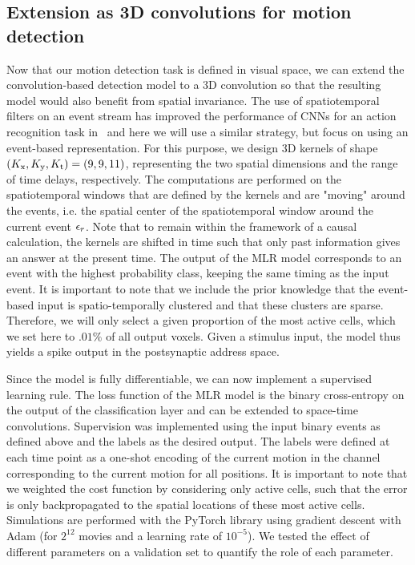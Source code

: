 \documentclass[default]{sn-jnl}%
\theoremstyle{thmstyleone}%
\theoremstyle{thmstyletwo}%
\theoremstyle{thmstylethree}%
\begin{document}
\subsection{Extension as 3D convolutions for motion detection}
%
Now that our motion detection task is defined in visual space, we can extend the convolution-based detection model to a 3D convolution so that the resulting model would also benefit from spatial invariance. The use of spatiotemporal filters on an event stream has improved the performance of CNNs for an action recognition task in~\cite{ghosh_spatiotemporal_2019} and here we will use a similar strategy, but focus on using an event-based representation.
For this purpose, we design 3D kernels of shape $(K_\text{x}, K_\text{y}, K_\text{t}) = (9, 9, 11)$, representing the two spatial dimensions and the range of time delays, respectively.
The computations are performed on the spatiotemporal windows that are defined by the kernels and are "moving" around the events, i.e. the spatial center of the spatiotemporal window around the current event $\epsilon_r$. Note that to remain within the framework of a causal calculation, the kernels are shifted in time such that only past information gives an answer at the present time.
%
The output of the MLR model corresponds to an event with the highest probability class, keeping the same timing as the input event. It is important to note that we include the prior knowledge that the event-based input is spatio-temporally clustered and that these clusters are sparse. Therefore, we will only select a given proportion of the most active cells, which we set here to $.01\%$ of all output voxels.
Given a stimulus input, the model thus yields a spike output in the postsynaptic address space.

%
Since the model is fully differentiable, we can now implement a supervised learning rule. The loss function of the MLR model is the binary cross-entropy on the output of the classification layer and can be extended to space-time convolutions. Supervision was implemented using the input binary events as defined above and the labels as the desired output. The labels were defined at each time point as a one-shot encoding of the current motion in the channel corresponding to the current motion for all positions. It is important to note that we weighted the cost function by considering only active cells, such that the error is only backpropagated to the spatial locations of these most active cells. Simulations are performed with the PyTorch library using gradient descent with Adam (for $2^{12}$ movies and a learning rate of $10^{-5}$). We tested the effect of different parameters on a validation set to quantify the role of each parameter.
\end{document}
